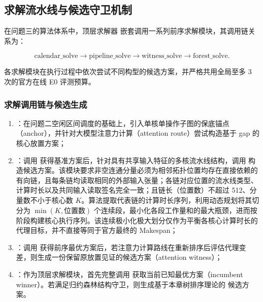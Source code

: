 \documentclass[anonymous,notoc]{gmcm2026}
\providecommand{\tightlist}{\setlength{\itemsep}{0pt}\setlength{\parskip}{0pt}}
\begin{document}
\subsection{求解流水线与候选守卫机制}

在问题三的算法体系中，顶层求解器 \texttt{} 嵌套调用一系列前序求解模块，其调用链关系为：

\begin{equation}
\text{calendar\_solve} \longrightarrow \text{pipeline\_solve} \longrightarrow \text{witness\_solve} \longrightarrow \text{forest\_solve}.
\end{equation}

各求解模块在执行过程中依次尝试不同构型的候选方案，并严格共用全局至多 3 次的官方在线 E0 评测预算。

\subsubsection{求解调用链与候选生成}

\begin{enumerate}
\def\labelenumi{\arabic{enumi}.}
\tightlist
\item
  \textbf{\texttt{}}：在问题二空闲区间调度的基础上，引入单核单操作子图的保底锚点（anchor），并针对大模型注意力计算（attention route）尝试构造基于 gap 的核心放置方案；
\item
  \textbf{\texttt{}}：调用 \texttt{} 获得基准方案后，针对具有共享输入特征的多核流水线结构，调用 \texttt{} 构造候选方案。该模块要求非空连通分量必须为相邻拓扑位置均存在直接依赖的有向链，且每条链均读取相同的外部输入张量；各链对应位置的流水线类型、计算时长以及共同输入读取签名完全一致；且链长（位置数）不超过 512、分量数不小于核心数 \(K\)。算法提取代表链的计算时长序列，利用动态规划将其切分为 \(\min(K, \text{位置数})\) 个连续段，最小化各段工作量和的最大瓶颈，进而按阶段构建核心执行序列。该连续极小化极大划分仅作为平衡各核心计算时长的代理目标，并不直接等同于官方最终的 Makespan；
\item
  \textbf{\texttt{}}：调用 \texttt{} 获得前序最优方案后，若注意力计算路线在重新排序后评估代理变差，则生成一份保留原放置见证的候选方案（attention witness）；
\item
  \textbf{\texttt{}}：作为顶层求解模块，首先完整调用 \texttt{} 获取当前已知最优方案（incumbent winner）。若满足归约森林结构守卫，则生成基于本章树排序理论的 \texttt{} 候选方案。
\end{enumerate}
\end{document}
